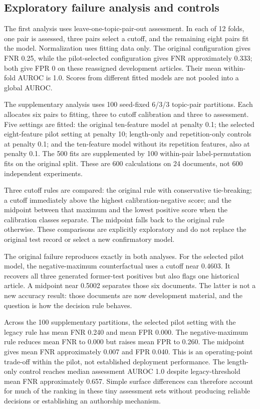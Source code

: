 \subsection{Exploratory failure analysis and controls}
The first analysis uses leave-one-topic-pair-out assessment. In each of 12 folds,
one pair is assessed, three pairs select a cutoff, and the remaining eight
pairs fit the model. Normalization uses fitting data only. The original
configuration gives FNR 0.25, while the pilot-selected configuration gives FNR
approximately 0.333; both give FPR 0 on these reassigned development articles.
Their mean within-fold AUROC is 1.0. Scores from different fitted models are
not pooled into a global AUROC.



The supplementary analysis uses 100 seed-fixed 6/3/3 topic-pair partitions.
Each allocates six pairs to fitting, three to cutoff calibration and three
to assessment. Five settings are fitted: the original ten-feature model at
penalty 0.1; the selected eight-feature pilot setting at penalty 10; length-only
and repetition-only controls at penalty 0.1; and the ten-feature model without
its repetition features, also at penalty 0.1. The 500 fits are supplemented by
100 within-pair label-permutation fits on the original split. These are 600
calculations on 24 documents, not 600 independent experiments.

Three cutoff rules are compared: the original rule with conservative
tie-breaking; a cutoff immediately above the highest calibration-negative
score; and the midpoint between that maximum and the lowest positive score
when the calibration classes separate. The midpoint falls back to the original
rule otherwise. These comparisons are explicitly exploratory and do not replace
the original test record or select a new confirmatory model.

The original failure reproduces exactly in both analyses. For the selected
pilot model, the negative-maximum counterfactual uses a cutoff near 0.4603.
It recovers all three generated former-test positives but also flags one
historical article. A midpoint near 0.5002 separates those six documents.
The latter is not a new accuracy result: those documents are now development
material, and the question is how the decision rule behaves.



Across the 100 supplementary partitions, the selected pilot setting with the
legacy rule has mean FNR 0.240 and mean FPR 0.000. The negative-maximum rule
reduces mean FNR to 0.000 but raises mean FPR to 0.260. The midpoint gives mean
FNR approximately 0.007 and FPR 0.040. This is an operating-point trade-off
within the pilot, not established deployment performance. The length-only
control reaches median assessment AUROC 1.0 despite legacy-threshold mean FNR
approximately 0.657. Simple surface differences can therefore account for much
of the ranking in these tiny assessment sets without producing reliable
decisions or establishing an authorship mechanism.

